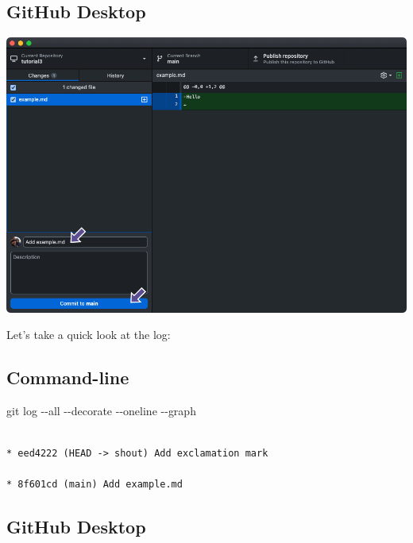 \documentclass[
  letterpaper,
  DIV=11,
  numbers=noendperiod]{scrartcl}
\newenvironment{Shaded}{\begin{snugshade}}{\end{snugshade}}
\newcommand{\NormalTok}[1]{\textcolor[rgb]{0.00,0.23,0.31}{#1}}
\newcommand{\SpecialCharTok}[1]{\textcolor[rgb]{0.37,0.37,0.37}{#1}}
\begin{document}
\subsection{GitHub Desktop}

\includegraphics{images/image30.png}

Let's take a quick look at the log:

\subsection{Command-line}

\begin{Shaded}
\begin{Highlighting}[]
\NormalTok{git log }\SpecialCharTok{{-}{-}}\NormalTok{all }\SpecialCharTok{{-}{-}}\NormalTok{decorate }\SpecialCharTok{{-}{-}}\NormalTok{oneline }\SpecialCharTok{{-}{-}}\NormalTok{graph}
\end{Highlighting}
\end{Shaded}

\begin{verbatim}

* eed4222 (HEAD -> shout) Add exclamation mark

* 8f601cd (main) Add example.md
\end{verbatim}

\subsection{GitHub Desktop}
\end{document}

